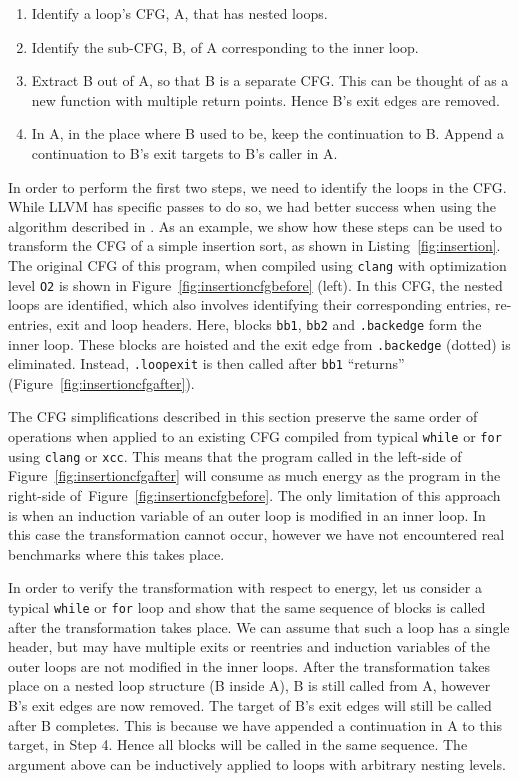 \documentclass[9pt,preprint]{sigplanconf}
\newcommand{\figref}[1]{Figure~\ref{fig:#1}}
\begin{document}
\begin{enumerate}
  \item Identify a loop's CFG, A, that has nested loops.
  \item Identify the sub-CFG, B, of A corresponding to the inner loop.
  \item Extract B out of A, so that B is a separate CFG. This can be thought
    of as a new function with multiple return points. Hence B's exit edges are
    removed.
  \item In A, in the place where B used to be, keep the continuation to B.
    Append a continuation to B's exit targets to B's caller in A.
\end{enumerate}

In order to perform the first two steps, we need to identify the loops in the
CFG. While LLVM has specific passes to do so, we had better success when using
the algorithm described in \cite{Wei2007}. As an example, we show how these
steps can be used to transform the CFG of a simple insertion sort, as shown in
Listing~\ref{fig:insertion}. The original CFG of this program, when compiled using
\texttt{clang} with optimization level \texttt{O2} is shown in
\figref{insertioncfgbefore} (left). In this CFG, the nested loops are identified, which
also involves identifying their corresponding entries, re-entries, exit and loop
headers. Here, blocks \texttt{bb1}, \texttt{bb2} and
\texttt{.backedge} form the inner loop. These blocks are hoisted and the exit
edge from \texttt{.backedge} (dotted) is eliminated. Instead, \texttt{.loopexit}
is then called after \texttt{bb1} ``returns'' (\figref{insertioncfgafter}).


The CFG simplifications described in this section preserve the same order of
operations when applied to an existing CFG compiled from typical \texttt{while}
or \texttt{for} using \texttt{clang} or \texttt{xcc}. This means that the program
called in the left-side of \figref{insertioncfgafter} will consume as much
energy as the program in the right-side of~\figref{insertioncfgbefore}. The only limitation of this approach is
when an induction variable of an outer loop is modified in an inner
loop. In this case the transformation cannot occur, however we have not
encountered real benchmarks where this takes place.

In order to verify the transformation with respect to energy, let us consider a
typical \texttt{while} or \texttt{for} loop and show that the same sequence of
blocks is called after the transformation takes place. We can assume that such a
loop has a single header, but may have multiple exits or reentries and induction
variables of the outer loops are not modified in the inner loops. After the
transformation takes place on a nested loop structure (B inside A), B is still
called from A, however B's exit edges are now removed. The target of B's
exit edges will still be called after B completes. This is because we have
appended a continuation in A to this target, in Step 4. Hence all blocks will be
called in the same sequence. The argument above can be inductively applied to
loops with arbitrary nesting levels.
\end{document}
